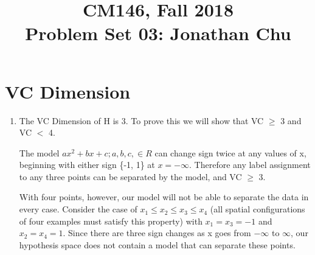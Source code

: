 \documentclass[11pt]{article}
\newcommand{\cnum}{CM146}
\newcommand{\ced}{Fall 2018}
\newcommand{\ctitle}[3]{\title{\vspace{-0.5in}\cnum, \ced\\Problem Set #1: #2}}
\begin{document}
\ctitle{03}{Jonathan Chu}
\date{}
\maketitle

\section{VC Dimension}
\begin{enumerate}
\item
The VC Dimension of H is 3. To prove this we will show that VC $\geq$ 3 and VC $<$ 4.

The model $ax^2 + bx + c; a, b, c, \in R$ can change sign twice at any values of x, beginning with either sign \{-1, 1\} at $x = -\infty$. Therefore any label assignment to any three points can be separated by the model, and VC $\geq$ 3.

With four points, however, our model will not be able to separate the data in every case. Consider the case of $x_1 \leq x_2 \leq x_3 \leq x_4$ (all spatial configurations of four examples must satisfy this property) with $x_1 = x_3 = -1$ and $x_2 = x_4 = 1$. Since there are three sign changes as x goes from $-\infty$ to $\infty$, our hypothesis space does not contain a model that can separate these points.
\end{enumerate}
\end{document}
